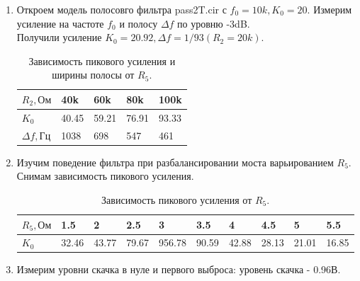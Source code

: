 \documentclass[12pt,a4paper]{article}
\begin{document}
\begin{enumerate}
    \item Откроем модель полосовго фильтра pass2T.cir с $f_0 = 10k, K_0 = 20$. Измерим усиление на частоте $f_0$ и полосу $\varDelta f$ по уровню -3dB. 
    \\ Получили усиление $K_0 = 20.92, \varDelta f = 1/93 (R_2 = 20k)$.

    \begin{table}[H]
        \centering
        \begin{center}
        \end{center}
        \vspace{0.1cm}
        \label{tab:my_label}
        \begin{tabular}{ |p{2cm}|p{1.5cm}|p{3cm}|p{1.5cm}|p{2cm}|}
     \hline
    $R_2, Ом$ &  40k & 60k & 80k & 100k \\
    \hline
    $K_0 $ &  40.45 & 59.21 & 76.91 & 93.33 \\
    \hline
    $\varDelta f, Гц$ & 1038 & 698 & 547 & 461 \\
    \hline
    \end{tabular}
    \caption{Зависимость пикового усиления и ширины полосы от $R_5$.}
    \end{table}
     
    \item  Изучим поведение фильтра при разбалансировании моста варьированием $R_5$. Снимам зависимость пикового усиления.
    
    \begin{table}[H]
        \centering
        \begin{center}
        \end{center}
        \vspace{0.1cm}
        \label{tab:my_label}
        \begin{tabular}{ |p{2cm}|p{1cm}|p{1cm}|p{1cm}|p{1cm}|p{1cm}|p{1cm}|p{1cm}|p{1cm}|p{1cm}|}
     \hline
    $R_5, Ом$ &  1.5 & 2 & 2.5 & 3 & 3.5 & 4 & 4.5 & 5 & 5.5 \\
    \hline
    $K_0 $ &  32.46 & 43.77 & 79.67 & 956.78 & 90.59 & 42.88 & 28.13 & 21.01 & 16.85 \\
    \hline
    \end{tabular}
    \caption{Зависимость пикового усиления от $R_5$.}
    \end{table}

    \item Измерим уровни скачка в нуле и первого выброса: уровень скачка - 0.96В. 
    

\end{enumerate}
\end{document}

